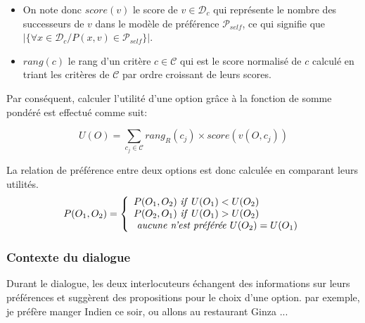 \documentclass [french]{sig-alternate-05-2015}
\begin{document}
 \begin{itemize}
 	\item On note donc $score(v)$ le score de $v \in \mathcal{D}_{c}$ qui représente le nombre des successeurs de  $v$  dans le modèle de préférence $\mathcal{P}_{self}$, ce qui signifie que $|\{ \forall x \in \mathcal{D}_{c} / P (x,v) \in \mathcal{P}_{self}\}|$.
 	\item $rang(c)$ le rang d'un critère $c \in \mathcal{C}$ qui est le score normalisé de $c$ calculé en triant les critères de $\mathcal{C}$ par ordre croissant de leurs scores.
 \end{itemize}
Par conséquent, calculer l'utilité d'une option grâce à la fonction de somme pondéré est effectué comme suit:

\[U(O) = \sum_{c_j \in \mathcal{C}}  rang_R(c_j) \times score\left( v(O, c_j) \right) \] 


\par La relation de préférence entre deux options est donc calculée en comparant leurs utilités. 
\[ P(O_1, O_2)  = \left \{
\begin{array}{l}
P(O_1, O_2)$ \textit{if}  $U(O_1) < U(O_2) \\
P(O_2, O_1)$  \textit{if} $U(O_1) > U(O_2)  \\
$  \textit{aucune n'est préférée}  $U(O_2) = U(O_1)\\
\end{array}
\right .\]

\subsubsection{Contexte du dialogue}
\par Durant le dialogue, les deux interlocuteurs échangent des informations sur leurs préférences et suggèrent des propositions pour le choix d'une option. par exemple, je préfère manger Indien ce soir, ou allons au restaurant Ginza ...
\end{document}
